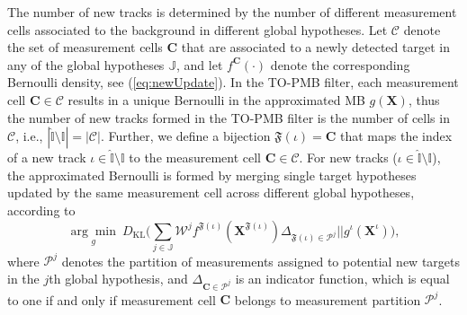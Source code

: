 \documentclass[journal]{IEEEtran}
\begin{document}
The number of new tracks is determined by the number of different measurement cells associated to the background in different global hypotheses. Let $\mathcal{C}$ denote the set of measurement cells $\mathbf{C}$ that are associated to a newly detected target in any of the global hypotheses $\mathbb{J}$, and let $f^{\mathbf{C}}(\cdot)$ denote the corresponding Bernoulli density, see (\ref{eq:newUpdate}). In the TO-PMB filter, each measurement cell $\mathbf{C}\in\mathcal{C}$ results in a unique Bernoulli in the approximated MB $g(\mathbf{X})$, thus the number of new tracks formed in the TO-PMB filter is the number of cells in $\mathcal{C}$, i.e., $|\hat{\mathbb{I}}\setminus\mathbb{I}|=|\mathcal{C}|$. 
Further, we define a bijection $\mathfrak{F}(\iota)=\mathbf{C}$ that maps the index of a new track $\iota\in\hat{\mathbb{I}}\setminus\mathbb{I}$ to the measurement cell $\mathbf{C}\in\mathcal{C}$. For new tracks ($\iota\in\hat{\mathbb{I}}\setminus\mathbb{I}$), the approximated Bernoulli is formed by merging single target hypotheses updated by the same measurement cell across different global hypotheses, according to
\begin{equation}
   \underset{g}{\arg\min}~D_{\text{KL}} \bigg(  \sum_{j\in\mathbb{J}}\mathcal{W}^jf^{\mathfrak{F}(\iota)}(\mathbf{X}^{\mathfrak{F}(\iota)})\Delta_{\mathfrak{F}(\iota)\in\mathcal{P}^j} ||g^{\iota}(\mathbf{X}^{\iota}) \bigg),
    \label{eq:tonew}
\end{equation}
where $\mathcal{P}^j$ denotes the partition of measurements assigned to potential new targets in the $j$th global hypothesis, and $\Delta_{\mathbf{C}\in\mathcal{P}^j}$ is an indicator function, which is equal to one if and only if measurement cell $\mathbf{C}$ belongs to measurement partition $\mathcal{P}^j$.
\end{document}
